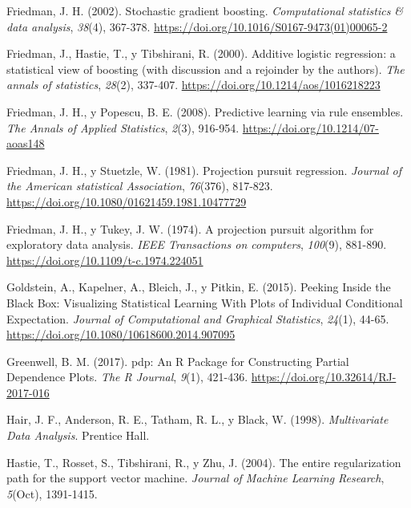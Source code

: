 \documentclass[
  spanish,
]{book}
\theoremstyle{break}
\theoremstyle{definition}
\theoremstyle{definition}
\theoremstyle{definition}
\theoremstyle{remark}
\begin{document}
\leavevmode\hypertarget{ref-friedman2002stochastic}{}%
Friedman, J. H. (2002). Stochastic gradient boosting. \emph{Computational statistics \& data analysis}, \emph{38}(4), 367-378. \url{https://doi.org/10.1016/S0167-9473(01)00065-2}

\leavevmode\hypertarget{ref-friedman2000additive}{}%
Friedman, J., Hastie, T., y Tibshirani, R. (2000). Additive logistic regression: a statistical view of boosting (with discussion and a rejoinder by the authors). \emph{The annals of statistics}, \emph{28}(2), 337-407. \url{https://doi.org/10.1214/aos/1016218223}

\leavevmode\hypertarget{ref-friedman2008predictive}{}%
Friedman, J. H., y Popescu, B. E. (2008). Predictive learning via rule ensembles. \emph{The Annals of Applied Statistics}, \emph{2}(3), 916-954. \url{https://doi.org/10.1214/07-aoas148}

\leavevmode\hypertarget{ref-friedman1981projection}{}%
Friedman, J. H., y Stuetzle, W. (1981). Projection pursuit regression. \emph{Journal of the American statistical Association}, \emph{76}(376), 817-823. \url{https://doi.org/10.1080/01621459.1981.10477729}

\leavevmode\hypertarget{ref-friedman1974projection}{}%
Friedman, J. H., y Tukey, J. W. (1974). A projection pursuit algorithm for exploratory data analysis. \emph{IEEE Transactions on computers}, \emph{100}(9), 881-890. \url{https://doi.org/10.1109/t-c.1974.224051}

\leavevmode\hypertarget{ref-goldstein2015peeking}{}%
Goldstein, A., Kapelner, A., Bleich, J., y Pitkin, E. (2015). Peeking Inside the Black Box: Visualizing Statistical Learning With Plots of Individual Conditional Expectation. \emph{Journal of Computational and Graphical Statistics}, \emph{24}(1), 44-65. \url{https://doi.org/10.1080/10618600.2014.907095}

\leavevmode\hypertarget{ref-greenwell2020dblp}{}%
Greenwell, B. M. (2017). pdp: An R Package for Constructing Partial Dependence Plots. \emph{The R Journal}, \emph{9}(1), 421-436. \url{https://doi.org/10.32614/RJ-2017-016}

\leavevmode\hypertarget{ref-hair1998multivariate}{}%
Hair, J. F., Anderson, R. E., Tatham, R. L., y Black, W. (1998). \emph{Multivariate Data Analysis}. Prentice Hall.

\leavevmode\hypertarget{ref-hastie2004entire}{}%
Hastie, T., Rosset, S., Tibshirani, R., y Zhu, J. (2004). The entire regularization path for the support vector machine. \emph{Journal of Machine Learning Research}, \emph{5}(Oct), 1391-1415.
\end{document}
